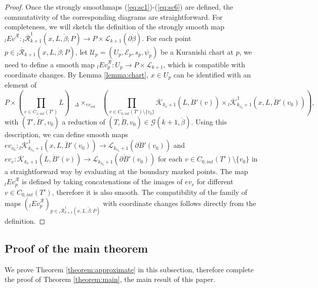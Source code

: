 \documentclass[a4paper]{article}
\numberwithin{equation}{section}
\begin{document}
\begin{proof}
Once the strongly smoothmaps (\ref{eq:sc1})-(\ref{eq:sc6}) are defined, the commutativity of the corresponding diagrams are straightforward. For completeness, we will sketch the definition of the strongly smooth map ${}_l\mathit{Ev}^\mathcal{R}:{}_l\overline{\mathcal{R}}_{k+1}^1(x,L,\ring{\beta};P)\rightarrow P\times\mathcal{L}_{k+1}(\partial\ring{\beta})$. For each point $p\in{}_l\overline{\mathcal{R}}_{k+1}(x,L,\ring{\beta};P)$, let $\mathcal{U}_p=(U_p,\mathcal{E}_p,s_p,\psi_p)$ be a Kuranishi chart at $p$, we need to define a smooth map ${}_l\mathit{Ev}^\mathcal{R}_p:U_p\rightarrow P\times\mathcal{L}_{k+1}$, which is compatible with coordinate changes. By Lemma \ref{lemma:chart}, $x\in U_p$ can be identified with an element of
\begin{equation}
P\times\left(\prod_{e\in C_{1,\mathit{int}}(T')}L\right)\textrm{ }{{}_\Delta\times_{\mathit{ev}_\mathit{int}}}\textrm{ }\left(\prod_{v\in C_{0,\mathit{int}}(T')\setminus\{v_0\}}\overline{\mathcal{K}}_{k_v+1}\left(L,\ring{B}'(v)\right)\times{}_l\overline{\mathcal{K}}_{k_{v_0}+1}^1\left(x,L,\ring{B}'(v_0)\right)\right),
\end{equation}
with $(T',\ring{B}',v_0)$ a reduction of $(T,\ring{B},v_0)\in\mathcal{G}(k+1,\ring{\beta})$. Using this description, we can define smooth maps $\mathit{ev}_{v_0}:{}_l\overline{\mathcal{K}}_{k_{v_0}+1}^1\left(x,L,\ring{B}'(v_0)\right)\rightarrow\mathcal{L}_{k_{v_0}+1}\left(\partial\ring{B}'(v_0)\right)$ and $\mathit{ev}_v:\overline{\mathcal{K}}_{k_v+1}\left(L,\ring{B}'(v)\right)\rightarrow\mathcal{L}_{k_{v_0}+1}\left(\partial\ring{B}'(v_0)\right)$ for each $v\in C_{0,\mathit{int}}(T')\setminus\{v_0\}$ in a straightforward way by evaluating at the boundary marked points. The map ${}_l\mathit{Ev}_p^\mathcal{R}$ is defined by taking concatenations of the images of $\mathit{ev}_v$ for different $v\in C_{0,\mathit{int}}(T')$, therefore it is also smooth. The compatibility of the family of maps $({}_l\mathit{Ev}_p^\mathcal{R})_{p\in{}_l\overline{\mathcal{R}}^1_{k+1}(x,L,\ring{\beta};P)}$ with coordinate changes follows directly from the definition.
\end{proof}

\subsection{Proof of the main theorem}\label{section:proof}

We prove Theorem \ref{theorem:approximate} in this subsection, therefore complete the proof of Theorem \ref{theorem:main}, the main result of this paper. 
\end{document}
